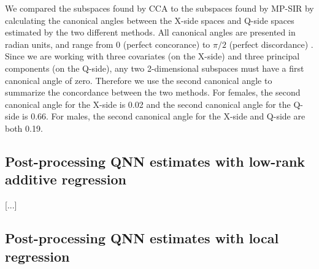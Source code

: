 
We compared the subspaces found by CCA to the subspaces found by MP-SIR
by calculating the canonical angles between the X-side spaces and Q-side
spaces estimated by the two different methods.  All canonical angles
are presented in radian units, and range from 0 (perfect concorance)
to $\pi/2$ (perfect discordance) .  Since we are working with three
covariates (on the X-side) and three principal components (on the Q-side),
any two 2-dimensional subspaces must have a first canonical angle of zero.
Therefore we use the second canonical angle to summarize the concordance
between the two methods.  For females, the second canonical angle for the
X-side is 0.02 and the second canonical angle for the Q-side is 0.66.
For males, the second canonical angle for the X-side and Q-side are
both 0.19.

\subsection{Post-processing QNN estimates with low-rank additive
regression}

[...]

\subsection{Post-processing QNN estimates with local regression}
